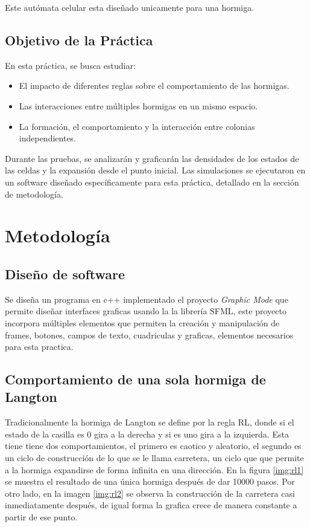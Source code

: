 \documentclass[12pt,twoside]{article}
\begin{document}
	Este autómata celular esta diseñado unicamente para una hormiga.
	
	\subsection{Objetivo de la Práctica}
	
	En esta práctica, se busca estudiar:  
	\begin{itemize}
		\item El impacto de diferentes reglas sobre el comportamiento de las hormigas.  
		\item Las interacciones entre múltiples hormigas en un mismo espacio.  
		\item La formación, el comportamiento y la interacción entre colonias independientes.  
	\end{itemize}
	
	Durante las pruebas, se analizarán y graficarán las densidades de los estados de las celdas y la expansión desde el punto inicial. Las simulaciones se ejecutaron en un software diseñado específicamente para esta práctica, detallado en la sección de metodología.
	
	\section{Metodología}
	
	\subsection{Diseño de software}
	
	Se diseña un programa en c++ implementado el proyecto \textit{Graphic Mode} que permite diseñar interfaces graficas usando la la librería SFML, este proyecto incorpora múltiples elementos que permiten la creación y manipulación de frames, botones, campos de texto, cuadriculas y graficas, elementos necesarios para esta practica.
	
	\subsection{Comportamiento de una sola hormiga de Langton}
	
	Tradicionalmente la hormiga de Langton se define por la regla RL, donde si el estado de la casilla es 0 gira a la derecha y si es uno gira a la izquierda. Esta tiene tiene dos comportamientos, el primero es caotico y aleatorio, el segundo es un ciclo de construcción de lo que se le llama carretera, un ciclo que que permite a la hormiga expandirse de forma infinita en una dirección. En la figura \ref{img:rl1} se muestra el resultado de una única hormiga después de dar 10000 pasos. Por otro lado, en la imagen \ref{img:rl2} se observa la construcción de la carretera casi inmediatamente después, de igual forma la grafica crece de manera constante a partir de ese punto.
	
\end{document}
